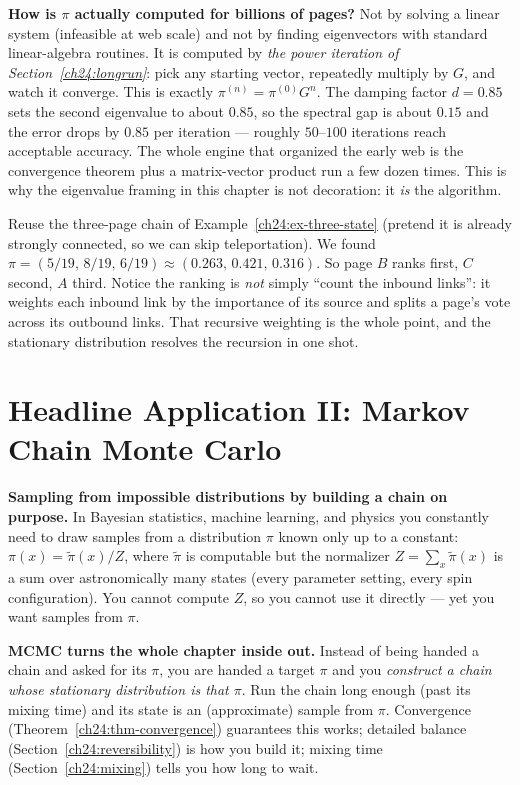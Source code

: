 \begin{happeningbox}
\textbf{How is $\pi$ actually computed for billions of pages?} Not by solving a
linear system (infeasible at web scale) and not by finding eigenvectors with
standard linear-algebra routines. It is computed by \emph{the power iteration of
Section~\ref{ch24:longrun}}: pick any starting vector, repeatedly multiply by $G$,
and watch it converge. This is exactly $\pi^{(n)} = \pi^{(0)} G^n$. The damping
factor $d=0.85$ sets the second eigenvalue to about $0.85$, so the spectral gap is
about $0.15$ and the error drops by $0.85$ per iteration --- roughly $50$--$100$
iterations reach acceptable accuracy. The whole engine that organized the early
web is the convergence theorem plus a matrix-vector product run a few dozen times.
This is why the eigenvalue framing in this chapter is not decoration: it
\emph{is} the algorithm.
\end{happeningbox}

\begin{example}
\label{ch24:ex-pagerank}
Reuse the three-page chain of Example~\ref{ch24:ex-three-state} (pretend it is
already strongly connected, so we can skip teleportation). We found
$\pi = (5/19,\,8/19,\,6/19) \approx (0.263,\,0.421,\,0.316)$. So page $B$ ranks
first, $C$ second, $A$ third. Notice the ranking is \emph{not} simply ``count the
inbound links'': it weights each inbound link by the importance of its source and
splits a page's vote across its outbound links. That recursive weighting is the
whole point, and the stationary distribution resolves the recursion in one shot.
\end{example}

\section{Headline Application II: Markov Chain Monte Carlo}
\label{ch24:mcmc}

\begin{applicationbox}
\textbf{Sampling from impossible distributions by building a chain on purpose.}
In Bayesian statistics, machine learning, and physics you constantly need to draw
samples from a distribution $\pi$ known only up to a constant:
$\pi(x) = \tilde\pi(x)/Z$, where $\tilde\pi$ is computable but the normalizer
$Z = \sum_x \tilde\pi(x)$ is a sum over astronomically many states (every
parameter setting, every spin configuration). You cannot compute $Z$, so you
cannot use it directly --- yet you want samples from $\pi$.

\textbf{MCMC turns the whole chapter inside out.} Instead of being handed a chain
and asked for its $\pi$, you are handed a target $\pi$ and you \emph{construct a
chain whose stationary distribution is that $\pi$}. Run the chain long enough
(past its mixing time) and its state is an (approximate) sample from $\pi$.
Convergence (Theorem~\ref{ch24:thm-convergence}) guarantees this works; detailed
balance (Section~\ref{ch24:reversibility}) is how you build it; mixing time
(Section~\ref{ch24:mixing}) tells you how long to wait.
\end{applicationbox}

